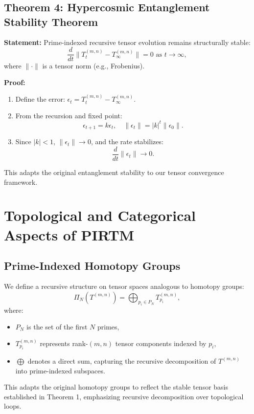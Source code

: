 \documentclass{article}
\theoremstyle{plain}
\begin{document}
\subsection{Theorem 4: Hypercosmic Entanglement Stability Theorem}
\textbf{Statement:} Prime-indexed recursive tensor evolution remains structurally stable:
\begin{equation}
    \frac{d}{dt} \| T_t^{(m,n)} - T_\infty^{(m,n)} \| = 0 \text{ as } t \to \infty,
\end{equation}
where \( \| \cdot \| \) is a tensor norm (e.g., Frobenius).

\textbf{Proof:}
\begin{enumerate}
    \item Define the error: \( \epsilon_t = T_t^{(m,n)} - T_\infty^{(m,n)} \).
    \item From the recursion and fixed point:
    \[
    \epsilon_{t+1} = k \epsilon_t, \quad \|\epsilon_t\| = |k|^t \|\epsilon_0\|.
    \]
    \item Since \( |k| < 1 \), \( \|\epsilon_t\| \to 0 \), and the rate stabilizes:
    \[
    \frac{d}{dt} \|\epsilon_t\| \to 0.
    \]
\end{enumerate}
This adapts the original entanglement stability to our tensor convergence framework.
\section{Topological and Categorical Aspects of PIRTM}

\subsection{Prime-Indexed Homotopy Groups}
We define a recursive structure on tensor spaces analogous to homotopy groups:
\begin{equation}
    \Pi_N(T^{(m,n)}) = \bigoplus_{p_i \in P_N} T_{p_i}^{(m,n)},
\end{equation}
where:
\begin{itemize}
    \item \( P_N \) is the set of the first \( N \) primes,
    \item \( T_{p_i}^{(m,n)} \) represents rank-$(m,n)$ tensor components indexed by \( p_i \),
    \item \( \bigoplus \) denotes a direct sum, capturing the recursive decomposition of \( T^{(m,n)} \) into prime-indexed subspaces.
\end{itemize}
This adapts the original homotopy groups to reflect the stable tensor basis established in Theorem 1, emphasizing recursive decomposition over topological loops.
\end{document}
